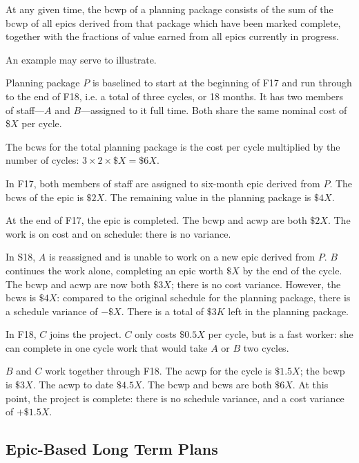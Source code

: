 At any given time, the \gls{bcwp} of a planning package consists of the sum of the \gls{bcwp} of all \glspl{epic} derived from that package which have been marked complete, together with the fractions of value earned from all \glspl{epic} currently in progress.

An example may serve to illustrate.

Planning package \(P\) is baselined to start at the beginning of F17 and run through to the end of F18, i.e. a total of three \glspl{cycle}, or 18 months. It has two members of staff---\(A\) and \(B\)---assigned to it full time.
Both share the same nominal cost of \$\(X\) per \gls{cycle}.

The \gls{bcws} for the total planning package is the cost per \gls{cycle} multiplied by the number of \glspl{cycle}: \(3 \times 2 \times \$X = \$6X\).

In F17, both members of staff are assigned to six-month \gls{epic} derived from \(P\).
The \gls{bcws} of the \gls{epic} is \(\$2X\).
The remaining value in the planning package is \(\$4X\).

At the end of F17, the \gls{epic} is completed.
The \gls{bcwp} and \gls{acwp} are both \(\$2X\).
The work is on cost and on schedule: there is no variance.

In S18, \(A\) is reassigned and is unable to work on a new \gls{epic} derived from \(P\).
\(B\) continues the work alone, completing an \gls{epic} worth \(\$X\) by the end of the \gls{cycle}.
The \gls{bcwp} and \gls{acwp} are now both \(\$3X\); there is no cost variance.
However, the \gls{bcws} is \(\$4X\): compared to the original schedule for the planning package, there is a schedule variance of \(-\$X\).
There is a total of \(\$3K\) left in the planning package.

In F18, \(C\) joins the project.
\(C\) only costs \(\$0.5X\) per \gls{cycle}, but is a fast worker: she can complete in one \gls{cycle} work that would take \(A\) or \(B\) two \glspl{cycle}.

\(B\) and \(C\) work together through F18.
The \gls{acwp} for the \gls{cycle} is \(\$1.5X\); the \gls{bcwp} is \(\$3X\). The \gls{acwp} to date \(\$4.5X\).
The \gls{bcwp} and \gls{bcws} are both \(\$6X\).
At this point, the project is complete: there is no schedule variance, and a cost variance of \(+\$1.5X\).

\subsection{Epic-Based Long Term Plans}

